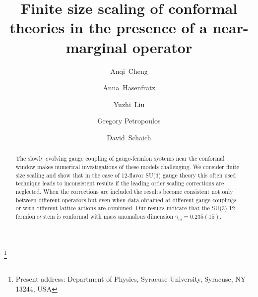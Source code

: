 \documentclass[aps,prl,twocolumn,]{revtex4-1}  %
\begin{document}
\title{Finite size scaling of conformal theories in the presence of a near-marginal operator}


\author{Anqi~Cheng}
\author{Anna~Hasenfratz}
\author{Yuzhi~Liu}
\author{Gregory Petropoulos}
\author{David~Schaich}
\thanks{Present address: Department of Physics, Syracuse University, Syracuse, NY 13244, USA}

\begin{abstract}
The  slowly evolving gauge coupling of   gauge-fermion systems near the conformal window makes  numerical investigations of these models challenging. We consider finite size scaling and show that in the case of 12-flavor SU(3) gauge theory this  often used technique leads to inconsistent results if the leading order scaling corrections are neglected. When the corrections are included the results become consistent not only between different operators but  even when  data obtained at different gauge couplings or with different lattice actions are combined. Our results indicate that the SU(3) 12-fermion system is conformal with mass anomalous dimension $\gamma_m=0.235(15)$. 
\end{abstract}

\maketitle


\end{document}
